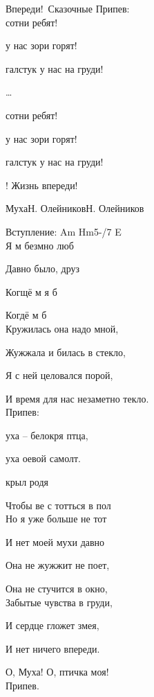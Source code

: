 \documentclass[11pt,a5paper]{book}
\renewcommand{\tt}{\indent \indent}
\begin{document}
\begin{song}{Впереди!}{}{~}{Сказочные}{}{}
Припев:\\
 сотни ребят!\par
{} у нас зори горят!\par
{} галстук у нас на груди!\par
{}…\par
{} сотни ребят!\par
{} у нас зори горят!\par
{} галстук у нас на груди!\par
{}! Жизнь впереди!\\

\end{song}



\begin{song}{Муха}{}{Н. Олейников}{Н. Олейников}{}{}

Вступление: Am Hm5-/7 E\\

Я м безмно люб    \par 
Давно было, друз   \par
Когщё м я б   \par
Когдё м б  \Ch{}{}\\

Кружилась она надо мной,\par
Жужжала и билась в стекло,\par
Я с ней целовался порой,\par
И время для нас незаметно текло.\\

Припев:\par
{}уха -- белокря птца, \Ch{}{}\par
{}уха оевой самолт.\par
{} крыл родя \par
Чтобы ве с тотться в пол\\

Но я уже больше не тот\par
И нет моей мухи давно\par
Она не жужжит не поет,\par
Она не стучится в окно,\\

Забытые чувства в груди,\par
И сердце гложет змея,\par
И нет ничего впереди.\par
О, Муха! О, птичка моя!\\

Припев.\\
\end{song}
\end{document}
